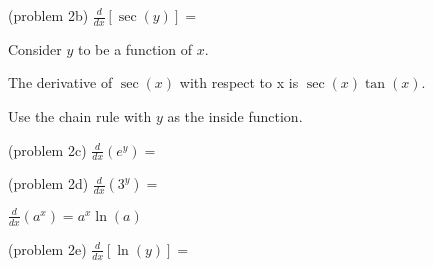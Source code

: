 \documentclass[handout]{ximera}
\begin{document}
\begin{problem}(problem 2b)
$\displaystyle{\frac{d}{dx} \left[\sec(y)\right]=}$
 
\begin{multipleChoice}
\end{multipleChoice}
    
    \begin{hint}
      Consider $y$ to be a function of $x$.
    \end{hint}
    \begin{hint}
     The derivative of $\sec(x)$ with respect to x is $\sec(x)\tan(x)$.
    \end{hint}
		\begin{hint}
      Use the chain rule with $y$ as the inside function.
    \end{hint}
    
\end{problem}


\begin{problem}(problem 2c)
$\displaystyle{\frac{d}{dx} \left(e^y\right)=}$
 
\begin{multipleChoice}
\end{multipleChoice}
	  
    
\end{problem}


\begin{problem}(problem 2d)
$\displaystyle{\frac{d}{dx} \left(3^y\right)=}$
 
\begin{multipleChoice}
\end{multipleChoice}
	  
    \begin{hint}
       $\frac{d}{dx}\left(a^x\right)=a^x\ln(a)$
    \end{hint}
  	
\end{problem}


\begin{problem}(problem 2e)
$\displaystyle{\frac{d}{dx} \left[\ln(y)\right]=}$
 
\begin{multipleChoice}
\end{multipleChoice}
    
\end{problem}
\end{document}
